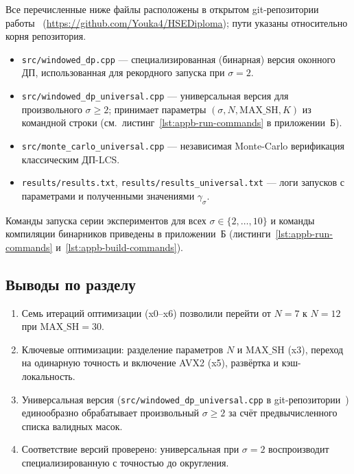 Все перечисленные ниже файлы расположены в открытом git-репозитории работы~\cite{ourgithub} (\url{https://github.com/Youka4/HSEDiploma}); пути указаны относительно корня репозитория.

\begin{itemize}
    \item \texttt{src/windowed\_dp.cpp} --- специализированная (бинарная) версия оконного ДП, использованная для рекордного запуска при $\sigma = 2$.
    \item \texttt{src/windowed\_dp\_universal.cpp} --- универсальная версия для произвольного $\sigma \geq 2$; принимает параметры $(\sigma, N, \mathrm{MAX\_SH}, K)$ из командной строки (см.\ листинг~\ref{lst:appb-run-commands} в приложении~Б).
    \item \texttt{src/monte\_carlo\_universal.cpp} --- независимая Monte-Carlo верификация классическим ДП-LCS.
    \item \texttt{results/results.txt}, \texttt{results/results\_universal.txt} --- логи запусков с параметрами и полученными значениями $\gamma_\sigma$.
\end{itemize}

Команды запуска серии экспериментов для всех $\sigma \in \{2, \ldots, 10\}$ и команды компиляции бинарников приведены в приложении~Б (листинги~\ref{lst:appb-run-commands} и~\ref{lst:appb-build-commands}).

\subsection*{Выводы по разделу}

\begin{enumerate}
    \item Семь итераций оптимизации (x0--x6) позволили перейти от $N = 7$ к $N = 12$ при $\mathrm{MAX\_SH} = 30$.
    \item Ключевые оптимизации: разделение параметров $N$ и $\mathrm{MAX\_SH}$ (x3), переход на одинарную точность и включение AVX2 (x5), развёртка и кэш-локальность.
    \item Универсальная версия (\texttt{src/windowed\_dp\_universal.cpp} в git-репозитории~\cite{ourgithub}) единообразно обрабатывает произвольный $\sigma \geq 2$ за счёт предвычисленного списка валидных масок.
    \item Соответствие версий проверено: универсальная при $\sigma = 2$ воспроизводит специализированную с точностью до округления.
\end{enumerate}
